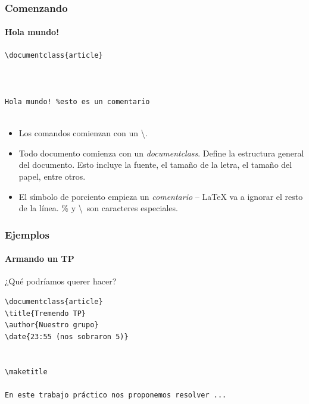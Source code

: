 \begin{frame}[fragile]
\frametitle{Comenzando}
\framesubtitle{Hola mundo!}

\begin{multicols}{2}
\begin{lstlisting}[title={hola\_mundo.tex}]
\documentclass{article}



Hola mundo! %esto es un comentario


\end{lstlisting}
\vspace*{\fill}
\columnbreak

\begin{itemize}
    \item Los comandos comienzan con un \textbackslash.
    \item Todo documento comienza con un \textit{documentclass}. Define la estructura general del documento. Esto incluye la fuente, el tamaño de la letra, el tamaño del papel, entre otros.    
    \item El símbolo de porciento empieza un \emph{comentario} -- \LaTeX{} va a ignorar el resto de la línea. \% y \textbackslash\ son caracteres especiales.
\end{itemize}


\end{multicols}
\end{frame}

\begin{frame}[fragile]
\frametitle{Ejemplos}
\framesubtitle{Armando un TP}

¿Qué podríamos querer hacer?

\begin{lstlisting}[title={segundoTP.tex}]
\documentclass{article}
\title{Tremendo TP}
\author{Nuestro grupo}
\date{23:55 (nos sobraron 5)}


\maketitle

En este trabajo práctico nos proponemos resolver ...


\end{lstlisting}

\end{frame}

